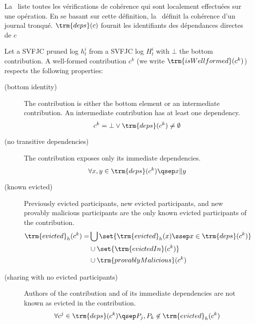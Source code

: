 La~ liste toutes les vérifications de cohérence qui sont localement effectuées sur une opération.
En se basant sur cette définition, la~ définit la cohérence d'un journal tronqué.
$\trm{deps}(c)$ fournit les identifiants des dépendances directes de $c$

\begin{definition}\label{def:wfc}
  Let a \ac{SVFJC} pruned log $h^i_t$ from a \ac{SVFJC} log $H^i_t$ with $\bot$ the bottom contribution. A well-formed contribution $c^k$ (we write $\trm{isWellformed}(c^k)$) respects the following properties:
  \begin{description}
    \item[ (bottom identity)]
    The contribution is either the bottom element or an intermediate contribution. An intermediate contribution has at least one dependency.
    \begin{equation*}
    c^k = \bot \lor \trm{deps}(c^k) \neq \emptyset
    \end{equation*}

    \item[ (no transitive dependencies)]
    The contribution exposes only its immediate dependencies.
    \begin{equation*}
    \forall x, y \in \trm{deps}(c^k) \qsep x \| y
    \end{equation*}

    \item[ (known evicted)]
    Previously evicted participants, new evicted participants, and new provably malicious participants are the only known evicted participants of the contribution.
    \begin{align*}
    \trm{evicted}_h(c^k) = &\bigcup \set{\trm{evicted}_h(x) \ssep x \in \trm{deps}(c^k)}\\
    &\cup \set{\trm{evictedIn}(c^k)}\\
    &\cup \trm{provablyMalicious}(c^k)
    \end{align*}

    \item[ (sharing with no evicted participants)]
    Authors of the contribution and of its immediate dependencies are not known as evicted in the contribution.
    \begin{equation*}
    \forall c^j \in \trm{deps}(c^k) \qsep P_j, P_k \not\in \trm{evicted}_h(c^k)
    \end{equation*}


\end{description}
\end{definition}
